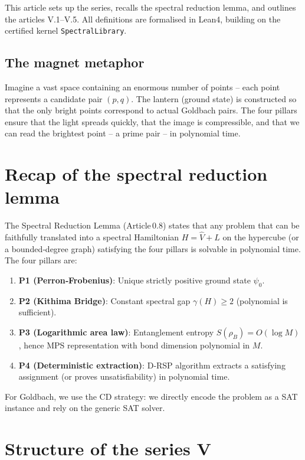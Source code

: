 \documentclass[11pt,a4paper]{article}
\begin{document}
This article sets up the series, recalls the spectral reduction lemma, and outlines the articles V.1–V.5. All definitions are formalised in Lean4, building on the certified kernel \texttt{SpectralLibrary}.

\subsection{The magnet metaphor}

Imagine a vast space containing an enormous number of points – each point represents a candidate pair \((p,q)\). The lantern (ground state) is constructed so that the only bright points correspond to actual Goldbach pairs. The four pillars ensure that the light spreads quickly, that the image is compressible, and that we can read the brightest point – a prime pair – in polynomial time.

\section{Recap of the spectral reduction lemma}

The Spectral Reduction Lemma (Article 0.8) states that any problem that can be faithfully translated into a spectral Hamiltonian \(H = \hat{V} + L\) on the hypercube (or a bounded‑degree graph) satisfying the four pillars is solvable in polynomial time. The four pillars are:

\begin{enumerate}
\item \textbf{P1 (Perron‑Frobenius)}: Unique strictly positive ground state \(\psi_0\).
\item \textbf{P2 (Kithima Bridge)}: Constant spectral gap \(\gamma(H) \ge 2\) (polynomial is sufficient).
\item \textbf{P3 (Logarithmic area law)}: Entanglement entropy \(S(\rho_B)=O(\log M)\), hence MPS representation with bond dimension polynomial in \(M\).
\item \textbf{P4 (Deterministic extraction)}: D‑RSP algorithm extracts a satisfying assignment (or proves unsatisfiability) in polynomial time.
\end{enumerate}

For Goldbach, we use the CD strategy: we directly encode the problem as a SAT instance and rely on the generic SAT solver.

\section{Structure of the series V}
\end{document}
